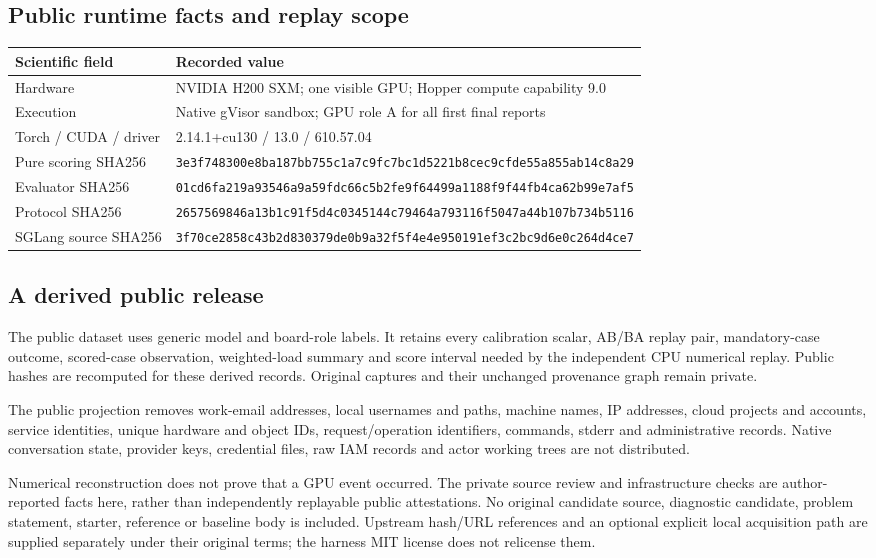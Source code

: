 \documentclass[11pt,letterpaper]{article}
\newcommand{\hash}[1]{{\footnotesize\nolinkurl{#1}}}
\begin{document}
\subsection{Public runtime facts and replay scope}

\small\begin{tabularx}{\linewidth}{@{}lX@{}}\toprule\textbf{Scientific field} & \textbf{Recorded value}\\\midrule
Hardware & NVIDIA H200 SXM; one visible GPU; Hopper compute capability 9.0\\
Execution & Native gVisor sandbox; GPU role A for all first final reports\\
Torch / CUDA / driver & 2.14.1+cu130 / 13.0 / 610.57.04\\
Pure scoring SHA256 & \hash{3e3f748300e8ba187bb755c1a7c9fc7bc1d5221b8cec9cfde55a855ab14c8a29}\\
Evaluator SHA256 & \hash{01cd6fa219a93546a9a59fdc66c5b2fe9f64499a1188f9f44fb4ca62b99e7af5}\\
Protocol SHA256 & \hash{2657569846a13b1c91f5d4c0345144c79464a793116f5047a44b107b734b5116}\\
SGLang source SHA256 & \hash{3f70ce2858c43b2d830379de0b9a32f5f4e4e950191ef3c2bc9d6e0c264d4ce7}\\
\bottomrule\end{tabularx}\normalsize

\subsection{A derived public release}

The public dataset uses generic model and board-role labels. It retains every calibration scalar, AB/BA replay pair, mandatory-case outcome, scored-case observation, weighted-load summary and score interval needed by the independent CPU numerical replay. Public hashes are recomputed for these derived records. Original captures and their unchanged provenance graph remain private.

The public projection removes work-email addresses, local usernames and paths, machine names, IP addresses, cloud projects and accounts, service identities, unique hardware and object IDs, request/operation identifiers, commands, stderr and administrative records. Native conversation state, provider keys, credential files, raw IAM records and actor working trees are not distributed.

Numerical reconstruction does not prove that a GPU event occurred. The private source review and infrastructure checks are author-reported facts here, rather than independently replayable public attestations. No original candidate source, diagnostic candidate, problem statement, starter, reference or baseline body is included. Upstream hash/URL references and an optional explicit local acquisition path are supplied separately under their original terms; the harness MIT license does not relicense them.
\end{document}
